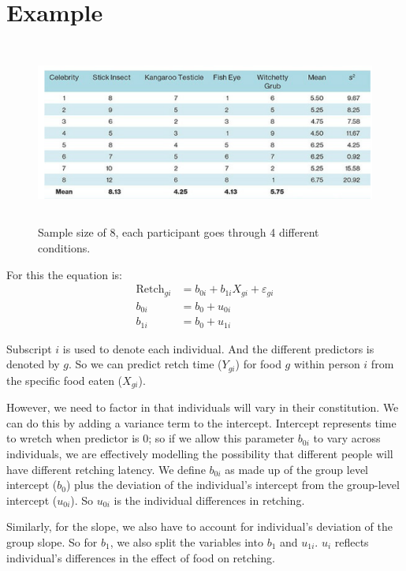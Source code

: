 \section{Example}
\begin{figure}[h]
	\includegraphics[width=1\textwidth,height=60mm]{Chapter 15 GLM 4 Repeated-measures designs/example.PNG}
	\caption{Sample size of 8, each participant goes through 4 different conditions. }
\end{figure}

For this the equation is:
\begin{equation}
\begin{split}
\text{Retch}_{gi} & = b_{0i} + b_{1i}X_{gi} + \varepsilon_{gi} \\
b_{0i} & = b_0 + u_{0i}\\
b_{1i} & = b_0 + u_{1i}
\end{split}
\end{equation}

Subscript $i$ is used to denote each individual. And the different predictors is denoted by $g$. So we can predict retch time ($Y_{gi}$) for food $g$ within person $i$  from the specific food eaten ($X_{gi}$).

However, we need to factor in that individuals will vary in their constitution. We can do this by adding a variance term to the intercept. Intercept represents time to wretch when predictor is 0; so if we allow this parameter $b_{0i}$ to vary across individuals, we are effectively modelling the possibility that different people will have different retching latency. We define $b_{0i}$ as made up of the group level intercept ($b_0$) plus the deviation of the individual's intercept from the group-level intercept ($u_{0i}$). So $u_{0i}$ is the individual differences in retching. 

Similarly, for the slope, we also have to account for individual's deviation of the group slope. So for $b_1$, we also split the variables into $b_1$ and $u_{1i}$. $u_i$ reflects individual's differences in the effect of food on retching.

